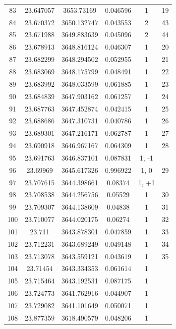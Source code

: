 \documentclass{aa}
\begin{document}
\begin{table}[]
\begin{tabular}{c|c|c|c|c|c}
83 &  23.647057 &   3653.73169 &  0.046596 &    1  &     19 \\
84 &  23.670372 &  3650.132747 &  0.043553 &   2  &     43 \\
85 &  23.671988 &  3649.883639 &  0.045096 &   2  &     44 \\
86 &  23.678913 &  3648.816124 &  0.046307 &  1   &  20 \\
87 &  23.682299 &  3648.294502 &  0.052955 &  1   &  21 \\
88 &  23.683069 &  3648.175799 &  0.048491 &  1   &  22 \\
89 &  23.683992 &  3648.033599 &  0.061885 &  1   &  23 \\
90 &  23.684839 &  3647.903162 &  0.061257 &  1   &    24 \\
91 &  23.687763 &  3647.452874 &  0.042415 &  1  &     25 \\
92 &  23.688686 &  3647.310731 &  0.040786 &  1  &     26 \\
93 &  23.689301 &  3647.216171 &  0.062787 &  1   &     27 \\
94 &  23.690918 &  3646.967167 &  0.064309 &  1   &     28 \\
95 &  23.691763 &  3646.837101 &  0.087831 &  1, -1   &      \\
96 &   23.69969 &  3645.617326 &  0.996922 &  1, 0   &     29 \\
97 &  23.707615 &  3644.398661 &   0.08374 &  1, +1   &      \\
98 &  23.708538 &  3644.256756 &   0.05529 &  1   &     30 \\
99 &  23.709307 &  3644.138609 &   0.04838 &  1   &     31 \\
100 &  23.710077 &  3644.020175 &   0.06274 &  1   &     32 \\
101 &     23.711 &  3643.878301 &  0.047859 &  1   &     33 \\
102 &  23.712231 &  3643.689249 &  0.049148 &  1   &     34 \\
103 &  23.713078 &  3643.559121 &  0.043619 &  1   &     35 \\
104 &   23.71454 &  3643.334353 &  0.061614 &  1   &         \\
105 &  23.715464 &  3643.192531 &  0.087175 &  1   &         \\
106 &  23.724773 &  3641.762916 &  0.044907 &  1   &         \\
107 &  23.729082 &  3641.101649 &  0.050071 &  1   &         \\
108 &  23.877359 &  3618.490579 &  0.048206 &    1  &      \\

\end{tabular}
\end{table}
\end{document}
